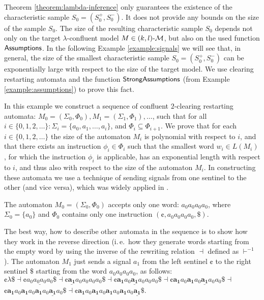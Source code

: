 Theorem \ref{theorem:lambda-inference} only guarantees the existence of the characteristic sample $S_0 = (S_0^+, S_0^-)$. It does not provide any bounds on the size of the sample $S_0$. The size of the resulting characteristic sample $S_0$ depends not only on the target $\lambda$-confluent model $M \in \textup{\sf $(k,l)$-\textup{\sf $\mathcal{M}$}}$, but also on the used function $\textup{\sf Assumptions}$. In the following Example \ref{example:signals} we will see that, in general, the size of the smallest characteristic sample $S_0 = (S_0^+, S_0^-)$ can be exponentially large with respect to the size of the target model. We use clearing restarting automata and the function $\textup{\sf StrongAssumptions}$ (from Example \ref{example:assumptions}) to prove this fact.

\begin{example}\label{example:signals}
In this example we construct a sequence of confluent $2$-clearing restarting automata: $M_0 = (\Sigma_0, \Phi_0), M_1 = (\Sigma_1, \Phi_1), \ldots$, such that for all $i \in \{0, 1, 2, \ldots\}: \Sigma_i = \{a_0, a_1, \ldots, a_i\}$, and $\Phi_i \subseteq \Phi_{i+1}$. We prove that for each $i \in \{0, 1, 2, \ldots\}$ the size of the automaton $M_i$ is polynomial with respect to $i$, and that there exists an instruction $\phi_i \in \Phi_i$ such that the smallest word $w_i \in L(M_i)$, for which the instruction $\phi_i$ is applicable, has an exponential  length with respect to $i$, and thus also with respect to the size of the automaton $M_i$. In constructing these automata we use a technique of sending signals from one  sentinel to the other (and vice versa), which was widely applied in \citep{CM10}.

The automaton $M_0 = (\Sigma_0, \Phi_0)$ accepts only one word: $a_0 a_0 a_0 a_0$, where $\Sigma_0 = \{ a_0 \}$ and $\Phi_0$ contains only one instruction $(\cent, a_0 a_0 a_0 a_0, \$)$.

The best way, how to describe other automata in the sequence is to show how they work in the reverse direction (i.\,e.\ how they generate words starting from the empty word by using the inverse of the rewriting relation $\dashv$ defined as $\vdash^{-1}$). The automaton $M_1$ just sends a signal $a_1$ from the left sentinel $\cent$ to the right sentinel $\$$ starting from the word $a_0 a_0 a_0 a_0$, as follows:
\\

\indent $\cent \lambda \$ \dashv \cent \underline{a_0 a_0 a_0 a_0} \$ \dashv
\cent \underline{\mathbf{a_1}} a_0 a_0 a_0 a_0 \$ \dashv
\cent \mathbf{a_1} a_0 \underline{\mathbf{a_1}} a_0 a_0 a_0 \$ \dashv
\cent \mathbf{a_1} a_0 \mathbf{a_1} a_0 \underline{\mathbf{a_1}} a_0 a_0 \$ \dashv $\\
\indent $\cent \mathbf{a_1} a_0 \mathbf{a_1} a_0 \mathbf{a_1} a_0
\underline{\mathbf{a_1}} a_0 \$ \dashv
\cent \mathbf{a_1} a_0 \mathbf{a_1} a_0 \mathbf{a_1} a_0 \mathbf{a_1} a_0
\underline{\mathbf{a_1}} \$$.
\\


\end{example}
